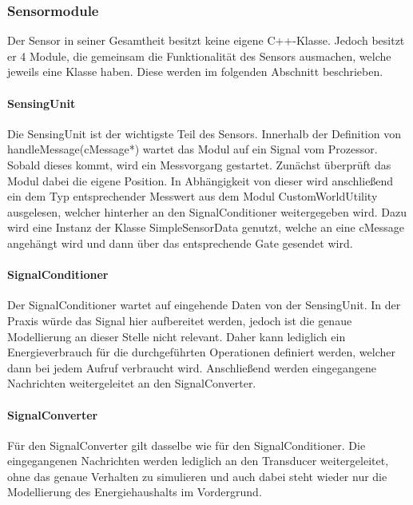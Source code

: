 \subsubsection{Sensormodule}

Der Sensor in seiner Gesamtheit besitzt keine eigene C++-Klasse. Jedoch besitzt er 4 Module, die gemeinsam die Funktionalität des Sensors ausmachen, welche jeweils eine Klasse haben. Diese werden im folgenden Abschnitt beschrieben.

\paragraph{SensingUnit}

Die SensingUnit ist der wichtigste Teil des Sensors. Innerhalb der Definition von handleMessage(cMessage*) wartet das Modul auf ein Signal vom Prozessor. Sobald dieses kommt, wird ein Messvorgang gestartet. Zunächst überprüft das Modul dabei die eigene Position. In Abhängigkeit von dieser wird anschließend ein dem Typ entsprechender Messwert aus dem Modul CustomWorldUtility ausgelesen, welcher hinterher an den SignalConditioner weitergegeben wird. Dazu wird eine Instanz der Klasse SimpleSensorData genutzt, welche an eine cMessage angehängt wird und dann über das entsprechende Gate gesendet wird.

\paragraph{SignalConditioner}

Der SignalConditioner wartet auf eingehende Daten von der SensingUnit. In der Praxis würde das Signal hier aufbereitet werden, jedoch ist die genaue Modellierung an dieser Stelle nicht relevant. Daher kann lediglich ein Energieverbrauch für die durchgeführten Operationen definiert werden, welcher dann bei jedem Aufruf verbraucht wird. Anschließend werden eingegangene Nachrichten weitergeleitet an den SignalConverter.

\paragraph{SignalConverter}

Für den SignalConverter gilt dasselbe wie für den SignalConditioner. Die eingegangenen Nachrichten werden lediglich an den Transducer weitergeleitet, ohne das genaue Verhalten zu simulieren und auch dabei steht wieder nur die Modellierung des Energiehaushalts im Vordergrund. 

